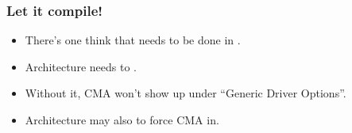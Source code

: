 \begin{frame}
  \frametitle{Let it compile!}

  \begin{itemize}
  \item There's one think that needs to be done in .
  \item Architecture needs to .
  \item Without it, CMA won't show up under “Generic Driver Options”.
  \item Architecture may also  to force CMA in.
  \end{itemize}
\end{frame}
